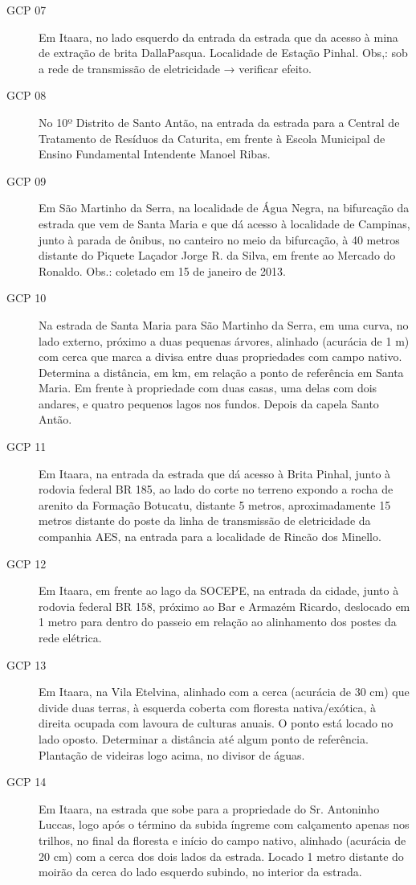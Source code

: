 \begin{description}
\item [GCP 07] Em Itaara, no lado esquerdo da entrada da estrada que da acesso à mina de extração de 
brita DallaPasqua. Localidade de Estação Pinhal. Obs,: sob a rede de transmissão de eletricidade → 
verificar efeito.

\item [GCP 08] No 10º Distrito de Santo Antão, na entrada da estrada para a Central de Tratamento de 
Resíduos da Caturita, em frente à Escola Municipal de Ensino Fundamental Intendente Manoel Ribas.

\item [GCP 09] Em São Martinho da Serra, na localidade de Água Negra, na bifurcação da estrada que 
vem de Santa Maria e que dá acesso à localidade de Campinas, junto à parada de ônibus, no canteiro 
no meio da bifurcação, à 40 metros distante do Piquete Laçador Jorge R. da Silva, em frente ao 
Mercado do Ronaldo. Obs.: coletado em 15 de janeiro de 2013.

\item [GCP 10] Na estrada de Santa Maria para São Martinho da Serra, em uma curva, no lado externo, 
próximo a duas pequenas árvores, alinhado (acurácia de 1 m) com cerca que marca a divisa entre duas 
propriedades com campo nativo. Determina a distância, em km, em relação a ponto de referência em 
Santa Maria. Em frente à propriedade com duas casas, uma delas com dois andares, e quatro pequenos 
lagos nos fundos. Depois da capela Santo Antão.

\item [GCP 11] Em Itaara, na entrada da estrada que dá acesso à Brita Pinhal, junto à rodovia 
federal BR 185, ao lado do corte no terreno expondo a rocha de arenito da Formação Botucatu, 
distante 5 metros, aproximadamente 15 metros distante do poste da linha de transmissão de 
eletricidade da companhia AES, na entrada para a localidade de Rincão dos Minello.

\item [GCP 12] Em Itaara, em frente ao lago da SOCEPE, na entrada da cidade, junto à rodovia federal 
BR 158, próximo ao Bar e Armazém Ricardo, deslocado em 1 metro para dentro do passeio em relação ao 
alinhamento dos postes da rede elétrica.

\item [GCP 13] Em Itaara, na Vila Etelvina, alinhado com a cerca (acurácia de 30 cm) que divide duas 
terras, à esquerda coberta com floresta nativa/exótica, à direita ocupada com lavoura de culturas 
anuais. O ponto está locado no lado oposto. Determinar a distância até algum ponto de referência. 
Plantação de videiras logo acima, no divisor de águas.

\item [GCP 14] Em Itaara, na estrada que sobe para a propriedade do Sr. Antoninho Luccas, logo após 
o término da subida íngreme com calçamento apenas nos trilhos, no final da floresta e início do 
campo nativo, alinhado (acurácia de 20 cm) com a cerca dos dois lados da estrada. Locado 1 metro 
distante do moirão da cerca do lado esquerdo subindo, no interior da estrada.
\end{description}

